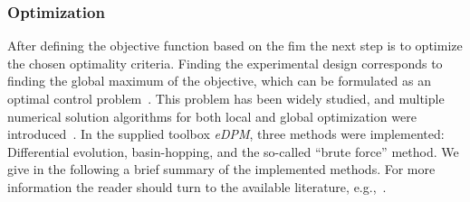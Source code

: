 \documentclass[graybox]{svmult}
\begin{document}
\subsubsection{Optimization}
After defining the objective function based on the \ac{fim} the next step is to optimize the chosen optimality criteria.
Finding the experimental design corresponds to finding the global maximum of the objective, which can be formulated as an optimal control problem~\cite{espie_optimal_1989}.
This problem has been widely studied, and multiple numerical solution algorithms for both local and global optimization were introduced~\cite{esposito_global_2000, bangaImprovingFoodProcessing2003, ali_numerical_1997, runarsson_stochastic_2000}.
In the supplied toolbox {\it eDPM}, three methods were implemented: Differential evolution, basin-hopping, and the so-called “brute force” method.
We give in the following a brief summary of the implemented methods.
For more information the reader should turn to the available literature, e.g.,~\cite{stornDifferentialEvolutionSimple1997, wales_global_1997}.
\end{document}

